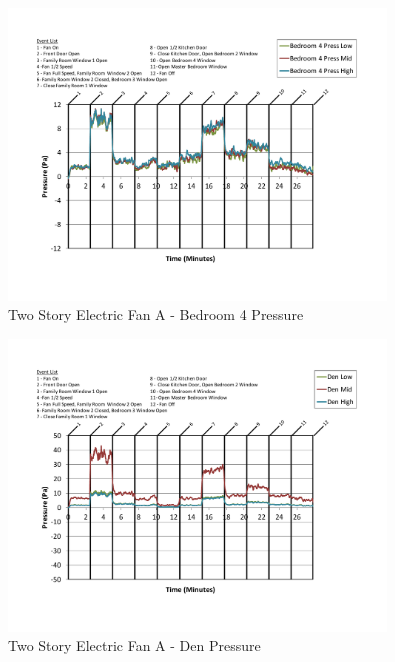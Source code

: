 \documentclass{article}
\begin{document}
\begin{appendices}
	\begin{figure}[H]
		\centering
		\includegraphics[height=3.05in,trim=0.67in 1.1in 0.67in 0.8in,clip=true]{0_Images/Results_Charts/ColdFlow/Two_Story/Electric/A/Bedroom_4_Pressure.pdf}
		\caption{Two Story Electric Fan A - Bedroom 4 Pressure}
	\end{figure}
 

	\begin{figure}[H]
		\centering
		\includegraphics[height=3.05in,trim=0.67in 1.1in 0.67in 0.8in,clip=true]{0_Images/Results_Charts/ColdFlow/Two_Story/Electric/A/Den_Pressure.pdf}
		\caption{Two Story Electric Fan A - Den Pressure}
	\end{figure}
 
	\clearpage


\end{appendices}
\end{document}
